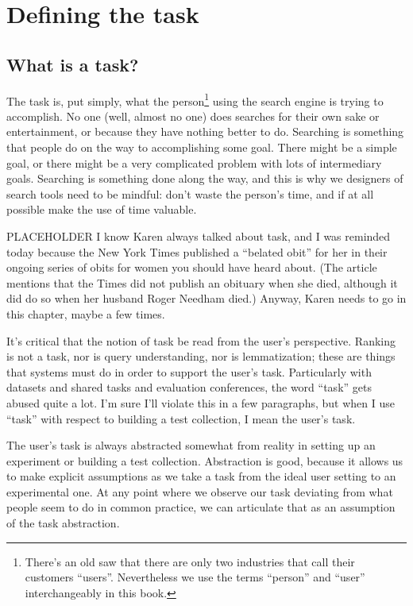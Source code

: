 \documentclass[nobib]{tufte-book}
\begin{document}
\chapter{Defining the task}

\section{What is a task?}

The task is, put simply, what the person\footnote{There's an old saw that there are only two industries that call their customers ``users''. Nevertheless we use the terms ``person'' and ``user'' interchangeably in this book.} using the search engine is trying to accomplish.  No one (well, almost no one) does searches for their own sake or entertainment, or because they have nothing better to do.  Searching is something that people do on the way to accomplishing some goal.  There might be a simple goal, or there might be a very complicated problem with lots of intermediary goals.  Searching is something done along the way, and this is why we designers of search tools need to be mindful: don't waste the person's time, and if at all possible make the use of time valuable.

PLACEHOLDER I know Karen always talked about task, and I was reminded today because the New York Times published a ``belated obit'' for her in their ongoing series of obits for women you should have heard about.  (The article mentions that the Times did not publish an obituary when she died, although it did do so when her husband Roger Needham died.)  Anyway, Karen needs to go in this chapter, maybe a few times.

It's critical that the notion of task be read from the user's perspective.  Ranking is not a task, nor is query understanding, nor is lemmatization; these are things that systems must do in order to support the user's task.  Particularly with datasets and shared tasks and evaluation conferences, the word ``task'' gets abused quite a lot.  I'm sure I'll violate this in a few paragraphs, but when I use ``task'' with respect to building a test collection, I mean the user's task.

The user's task is always abstracted somewhat from reality in setting up an experiment or building a test collection.  Abstraction is good, because it allows us to make explicit assumptions as we take a task from the ideal user setting to an experimental one.  At any point where we observe our task deviating from what people seem to do in common practice, we can articulate that as an assumption of the task abstraction.
\end{document}
